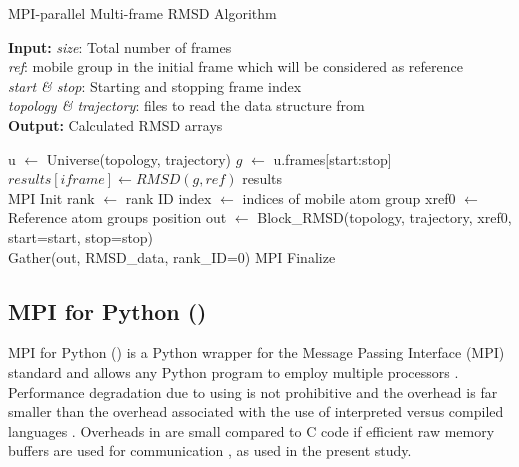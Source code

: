 \begin{algorithm}[ht!]
	\scriptsize
	\caption{MPI-parallel Multi-frame RMSD Algorithm}
	\label{alg:RMSD}
	\hspace*{\algorithmicindent} \textbf{Input:} \emph{size}: Total number of frames \\
	\hspace*{\algorithmicindent} \emph{ref}: mobile group in the initial frame which will be considered as reference \\
	\hspace*{\algorithmicindent} \emph{start \& stop}: Starting and stopping frame index\\
	\hspace*{\algorithmicindent} \emph{topology \& trajectory}: files to read the data structure from \\
	\hspace*{\algorithmicindent} \textbf{Output:} Calculated RMSD arrays
	\begin{algorithmic}[1]
		\State u $\leftarrow$ Universe(topology, trajectory)
		\State $g$ $\leftarrow$ u.frames[start:stop]
		\State $results[iframe] \leftarrow RMSD(g, ref)$
		\EndFor
		\State \Return results
		\EndProcedure
		\\        
		\State MPI Init
		\State rank $\leftarrow$ rank ID
		\State index $\leftarrow$ indices of mobile atom group
		\State xref0 $\leftarrow$ Reference atom group\textsc{}s position
		\State out $\leftarrow$ Block\_RMSD(topology, trajectory, xref0, start=start, stop=stop)
		\\
		\State Gather(out, RMSD\_data, rank\_ID=0)
		\State MPI Finalize
	\end{algorithmic}
\end{algorithm}


\subsection{MPI for Python ()}
\label{sec:methods-mpi4py}

MPI for Python () is a Python wrapper for the Message Passing Interface (MPI) standard and allows any Python program to employ multiple processors \cite{Dalcin:2011aa, Dalcin:2005aa}.
Performance degradation due to using  is not prohibitive \cite{Dalcin:2011aa, Dalcin:2005aa} and the overhead is far smaller than the overhead associated with the use of interpreted versus compiled languages \cite{GAiN}.
Overheads in  are small compared to C code if efficient raw memory buffers are used for communication \cite{Dalcin:2011aa}, as used in the present study.

